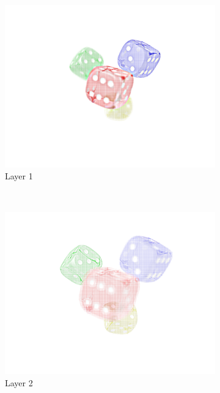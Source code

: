 \documentclass[11pt,a4paper,titlepage]{article}
\begin{document}
\begin{figure}[h]
	\centering
	\begin{subfigure}[c]{0.3\textwidth}
 		\includegraphics[width=\textwidth]{results/dice_perspective_rec_3Layers_r=1/1.png}
  		\caption{Layer 1}
	\end{subfigure}%
	~
	\begin{subfigure}[c]{0.3\textwidth}
		\includegraphics[width=\textwidth]{results/dice_perspective_rec_3Layers_r=1/2.png}
		\caption{Layer 2}
	\end{subfigure}%
	~
	\begin{subfigure}[c]{0.3\textwidth}

\end{subfigure}
\end{figure}
\end{document}
